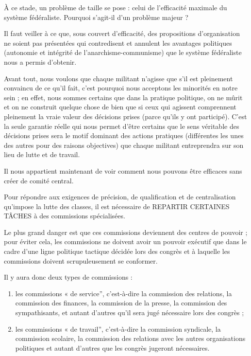 À ce stade, un problème de taille se pose : celui de l'efficacité maximale du système fédéraliste. Pourquoi s'agit-il d'un problème majeur ?

Il faut veiller à ce que, sous couvert d'efficacité, des propositions d'organisation ne soient pas présentées qui contredisent et annulent les avantages politiques (autonomie et intégrité de l'anarchisme-communisme) que le système fédéraliste nous a permis d'obtenir.

Avant tout, nous voulons que chaque militant n'agisse que s'il est pleinement convaincu de ce qu'il fait, c'est pourquoi nous acceptons les minorités en notre sein ; en effet, nous sommes certains que dans la pratique politique, on ne mûrit et on ne construit quelque chose de bien que si ceux qui agissent comprennent pleinement la vraie valeur des décisions prises (parce qu'ils y ont participé). C'est la seule garantie réelle qui nous permet d'être certains que le sens véritable des décisions prises sera le motif dominant des actions pratiques (différentes les unes des autres pour des raisons objectives) que chaque militant entreprendra sur son lieu de lutte et de travail.

Il nous appartient maintenant de voir comment nous pouvons être efficaces sans créer de comité central.

Pour répondre aux exigences de précision, de qualification et de centralisation qu'impose la lutte des classes, il est nécessaire de REPARTIR CERTAINES TÂCHES à des commissions spécialisées.

Le plus grand danger est que ces commissions deviennent des centres de pouvoir ; pour éviter cela, les commissions ne doivent avoir un pouvoir exécutif que dans le cadre d'une ligne politique tactique décidée lors des congrès et à laquelle les commissions doivent scrupuleusement se conformer.

Il y aura donc deux types de commissions :

\begin{enumerate}
\item{} les commissions « de service'', c'est-à-dire la commission des relations, la commission des finances, la commission de la presse, la commission des sympathisants, et autant d'autres qu'il sera jugé nécessaire lors des congrès ;
\item{} les commissions « de travail'', c'est-à-dire la commission syndicale, la commission scolaire, la commission des relations avec les autres organisations politiques et autant d'autres que les congrès jugeront nécessaires.
\end{enumerate}

